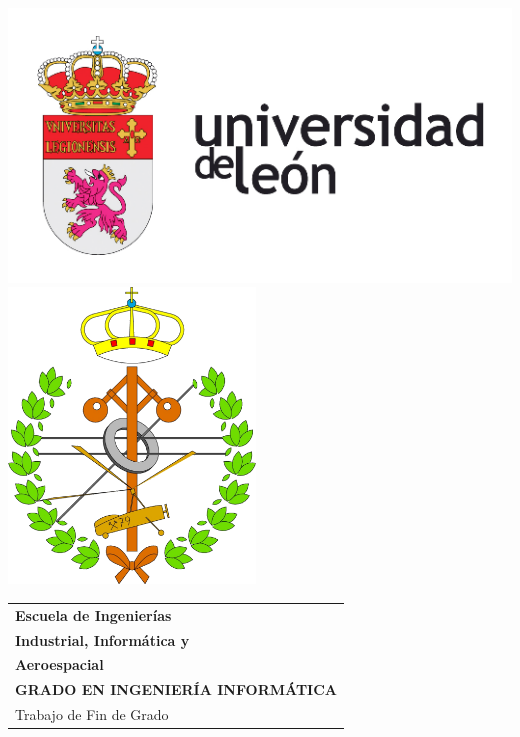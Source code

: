 \thispagestyle{empty}
\graphicspath{{./res/images/}}

\begin{table}[ht]
	\centering

	\hfill
	\\[-10ex]
	\includegraphics{imageULE}
	\hfill
	\includegraphics{imageInformatica}
	\\[10ex]

	\label{tab:coverTopCenter}
	\begin{tabular}{p{1\linewidth}}
		\centering
		\LARGE\textbf{Escuela de Ingenierías}
		\\[1.5ex]

		\LARGE\textbf{Industrial, Informática y} \\
		\LARGE\textbf{Aeroespacial}
		\\[2.3ex]

		\LARGE\textbf{GRADO EN INGENIERÍA INFORMÁTICA}
		\\[5ex]

		\LARGE{Trabajo de Fin de Grado}
		\\[5ex]


\end{tabular}
\end{table}
